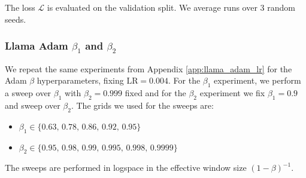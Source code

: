 \noindent 
The loss \(\mathcal{L}\) is evaluated on the validation split. We average runs over 3 random seeds.

\subsubsection{\texorpdfstring{Llama Adam $\beta_1$ and $\beta_2$}{Llama Adam beta1 and beta2}}\label{app:adam_betas}
We repeat the same experiments from Appendix \ref{app:llama_adam_lr} for the Adam $\beta$ hyperparameters, fixing $\mathrm{LR} = 0.004$. For the $\beta_1$ experiment, we perform a sweep over $\beta_1$ with $\beta_2 = 0.999$ fixed and for the $\beta_2$ experiment we fix $\beta_1 = 0.9$ and sweep over $\beta_2$. The grids we used for the sweeps are:
\begin{itemize}
    \item $\beta_1 \in \{0.63,\, 0.78,\, 0.86,\, 0.92,\, 0.95\}$
    \item $\beta_2 \in \{0.95,\, 0.98,\, 0.99,\, 0.995,\, 0.998,\, 0.9999\}$
\end{itemize}
The sweeps are performed in logspace in the effective window size $(1 - \beta)^{-1}$. 

